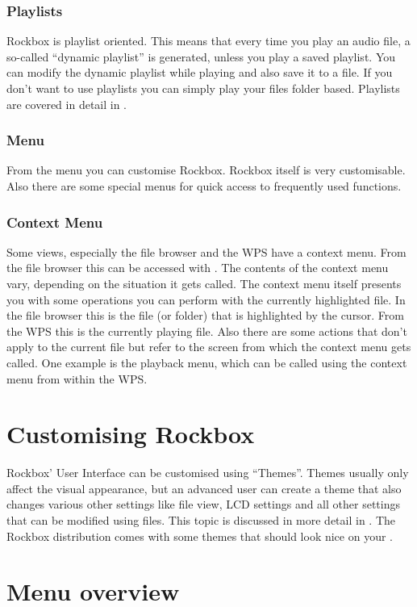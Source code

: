 \subsubsection{Playlists}
Rockbox is playlist oriented. This means that every time you play an audio file,
a so-called ``dynamic playlist'' is generated, unless you play a saved
playlist. You can modify the dynamic playlist while playing and also save
it to a file. If you don't want to use playlists you can simply play your
files folder based.
Playlists are covered in detail in .

\subsubsection{Menu}
From the menu you can customise Rockbox. Rockbox itself is very customisable.
Also there are some special menus for quick access to frequently used
functions.

\subsubsection{Context Menu}
Some views, especially the file browser and the WPS have a context menu.
From the file browser this can be accessed with \ActionStdContext{}.
The contents of the context menu vary, depending on the situation it gets
called. The context menu itself presents you with some operations you can
perform with the currently highlighted file. In the file browser this is
the file (or folder) that is highlighted by the cursor. From the WPS this is
the currently playing file. Also there are some actions that don't apply
to the current file but refer to the screen from which the context menu
gets called. One example is the playback menu, which can be called using
the context menu from within the WPS.

\section{Customising Rockbox}
Rockbox' User Interface can be customised using ``Themes''. Themes usually
only affect the visual appearance, but an advanced user can create a theme
that also changes various other settings like file view, LCD settings and
all other settings that can be modified using  files. This topic
is discussed in more detail in .
The Rockbox distribution comes with some themes that should look nice on
your \dap{}. 

\section{Menu overview}
%


